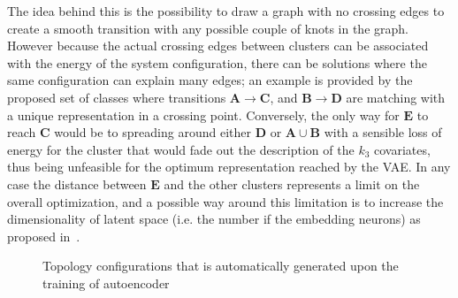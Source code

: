 The idea behind this is the possibility to draw a graph with no crossing edges to create a smooth transition with any possible couple of knots in the graph. However because the actual crossing edges between clusters can be associated with the energy of the system configuration, there can be solutions where the same configuration can explain many edges; an example is provided by the proposed set of classes where transitions $\bm{A} \rightarrow \bm{C}$, and $\bm{B} \rightarrow \bm{D}$ are matching with a unique representation in a crossing point. 
Conversely, the only way for $\bm{E}$ to reach $\bm{C}$ would be to spreading around either $\bm{D}$ or $\bm{A}\cup\bm{B}$ with a sensible loss of energy for the cluster that would fade out the description of the $k_3$ covariates, thus being unfeasible for the optimum representation reached by the \acs{VAE}.
In any case the distance between $\bm{E}$ and the other clusters represents a limit on the overall optimization, and a possible way around this limitation is to increase the dimensionality of latent space (i.e. the number if the embedding neurons) as proposed in~\Figure{\ref{fig:voronoi_3d}}.
\begin{figure}
    \centering
    \caption{Topology configurations that is automatically generated upon the training of autoencoder } 
    \label{fig:voronoi}
\end{figure}

